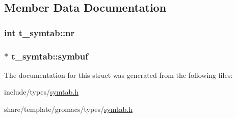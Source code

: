 \subsection{\-Member \-Data \-Documentation}
\hypertarget{structt__symtab_a3a90a1c9860c6a6e06b573a9b339695e}{
\subsubsection[{nr}]{\setlength{\rightskip}{0pt plus 5cm}int {\bf t\-\_\-symtab\-::nr}}}\label{structt__symtab_a3a90a1c9860c6a6e06b573a9b339695e}
\hypertarget{structt__symtab_a1a2b7f6df8223a58af453450b50d2022}{
\subsubsection[{symbuf}]{ $\ast$ {\bf t\-\_\-symtab\-::symbuf}}}\label{structt__symtab_a1a2b7f6df8223a58af453450b50d2022}


\-The documentation for this struct was generated from the following files\-:\begin{DoxyCompactItemize}
\item 
include/types/\hyperlink{include_2types_2symtab_8h}{symtab.\-h}\item 
share/template/gromacs/types/\hyperlink{share_2template_2gromacs_2types_2symtab_8h}{symtab.\-h}\end{DoxyCompactItemize}

